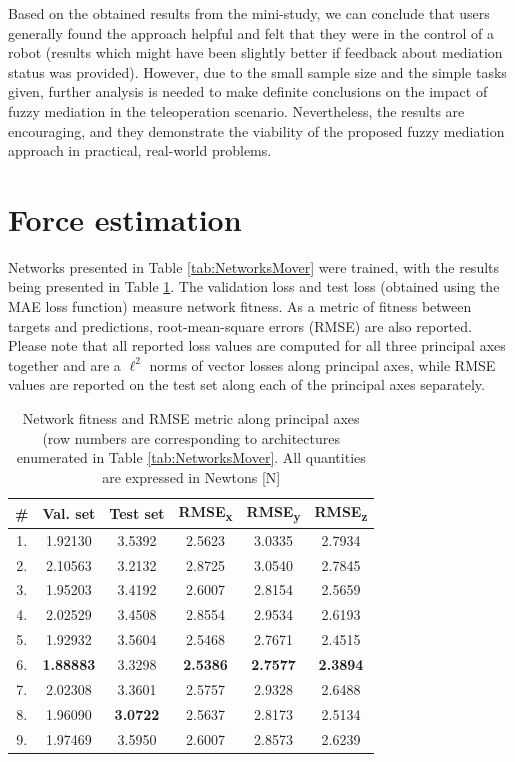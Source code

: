 Based on the obtained results from the mini-study, we can conclude that users generally found the approach helpful and felt that they were in the control of a robot (results which might have been slightly better if feedback about mediation status was provided). However, due to the small sample size and the simple tasks given, further analysis is needed to make definite conclusions on the impact of fuzzy mediation in the teleoperation scenario. Nevertheless, the results are encouraging, and they demonstrate the viability of the proposed fuzzy mediation approach in practical, real-world problems.

\section{Force estimation}

Networks presented in Table \ref{tab:NetworksMover} were trained, with the results being presented in Table \ref{tab:ResultsMover}. The validation loss and test loss (obtained using the MAE loss function) measure network fitness.  As a metric of fitness between targets and predictions, root-mean-square errors (RMSE) are also reported. Please note that all reported loss values are computed for all three principal axes together and are a $\ell^2$ norms of vector losses along principal axes, while RMSE values are reported on the test set along each of the principal axes separately.

\begin{table}
    \caption{Network fitness and RMSE metric along principal axes (row numbers are corresponding to architectures enumerated in Table \ref{tab:NetworksMover}. All quantities are expressed in Newtons [N]}
    \label{tab:ResultsMover}
    \centering
    \begin{tabular}{|c|c|c|c|c|c|}
        \hline
        \textbf{\#} & \textbf{Val. set} & \textbf{Test set} & \textbf{RMSE\textsubscript{x}} & \textbf{RMSE\textsubscript{y}} & \textbf{RMSE\textsubscript{z}} \\
        \hline
        \hline
        1. & 1.92130 & 3.5392 & 2.5623 & 3.0335 & 2.7934\\
        \hline
        2. & 2.10563 & 3.2132 & 2.8725 & 3.0540 & 2.7845\\
        \hline
        3. & 1.95203 & 3.4192 & 2.6007 & 2.8154 & 2.5659\\
        \hline
        4. & 2.02529 & 3.4508 & 2.8554 & 2.9534 & 2.6193 \\
        \hline
        5. & 1.92932 & 3.5604 & 2.5468 & 2.7671 & 2.4515\\
        \hline
        6. & \textbf{1.88883} & 3.3298 & \textbf{2.5386} & \textbf{2.7577} & \textbf{2.3894} \\
        \hline
        7. & 2.02308 & 3.3601 & 2.5757 & 2.9328 & 2.6488 \\
        \hline
        8. & 1.96090 & \textbf{3.0722} & 2.5637 & 2.8173 & 2.5134\\
        \hline
        9. & 1.97469 & 3.5950 & 2.6007 & 2.8573 & 2.6239 \\
        \hline
    \end{tabular}
\end{table}

